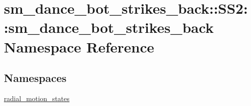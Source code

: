 \hypertarget{namespacesm__dance__bot__strikes__back_1_1SS2_1_1sm__dance__bot__strikes__back}{}\section{sm\+\_\+dance\+\_\+bot\+\_\+strikes\+\_\+back\+:\+:S\+S2\+:\+:sm\+\_\+dance\+\_\+bot\+\_\+strikes\+\_\+back Namespace Reference}
\label{namespacesm__dance__bot__strikes__back_1_1SS2_1_1sm__dance__bot__strikes__back}
\subsection*{Namespaces}
\begin{DoxyCompactItemize}
\item 
 \hyperlink{namespacesm__dance__bot__strikes__back_1_1SS2_1_1sm__dance__bot__strikes__back_1_1radial__motion__states}{radial\+\_\+motion\+\_\+states}
\end{DoxyCompactItemize}
